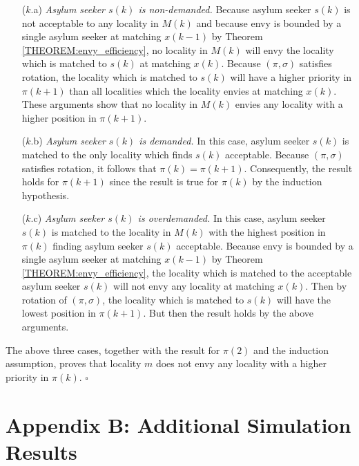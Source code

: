 \documentclass[12pt,fleqn]{article}
\begin{document}
\begin{itemize}
\item[($k$.a)] \emph{Asylum seeker $s(k)$ is non-demanded.} Because asylum seeker $s(k)$ is not acceptable to any locality in $M(k)$ and because envy is bounded by a single asylum seeker at matching $x(k-1)$ by Theorem \ref{THEOREM:envy_efficiency}, no locality in $M(k)$ will envy the locality which is matched to $s(k)$ at matching $x(k)$. Because $(\pi,\sigma)$ satisfies rotation, the locality which is matched to $s(k)$ will have a higher priority in $\pi(k+1)$ than all localities which the locality envies at matching $x(k)$. These arguments show that no locality in $M(k)$ envies any locality with a higher position in $\pi(k+1)$.

\item[($k$.b)] \emph{Asylum seeker $s(k)$ is demanded.} In this case, asylum seeker $s(k)$ is matched to the only locality which finds $s(k)$ acceptable. Because $(\pi,\sigma)$ satisfies rotation, it follows that $\pi(k)=\pi(k+1)$. Consequently, the result holds for $\pi(k+1)$ since the result is true for $\pi(k)$ by the induction hypothesis.

\item[($k$.c)] \emph{Asylum seeker $s(k)$ is overdemanded.} In this case, asylum seeker $s(k)$ is matched to the locality in $M(k)$ with the highest position in $\pi(k)$ finding asylum seeker $s(k)$ acceptable. Because envy is bounded by a single asylum seeker at matching $x(k-1)$ by Theorem \ref{THEOREM:envy_efficiency}, the locality which is matched to the acceptable asylum seeker $s(k)$ will not envy any locality at matching $x(k)$. Then by rotation of $(\pi,\sigma)$, the locality which is matched to $s(k)$ will have the lowest position in $\pi(k+1)$. But then the result holds by the above arguments.
\end{itemize}

\noindent The above three cases, together with the result for $\pi(2)$ and the induction assumption, proves that locality $m$ does not envy any locality with a higher priority in $\pi(k)$. \hfill $\square$

\section*{Appendix B: Additional Simulation Results}
\end{document}
